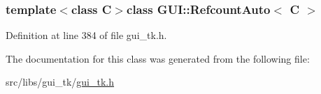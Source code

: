 \subsubsection*{template$<$class C$>$class G\-U\-I\-::\-Refcount\-Auto$<$ C $>$}



Definition at line 384 of file gui\-\_\-tk.\-h.



The documentation for this class was generated from the following file\-:\begin{DoxyCompactItemize}
\item 
src/libs/gui\-\_\-tk/\hyperlink{gui__tk_8h}{gui\-\_\-tk.\-h}\end{DoxyCompactItemize}
